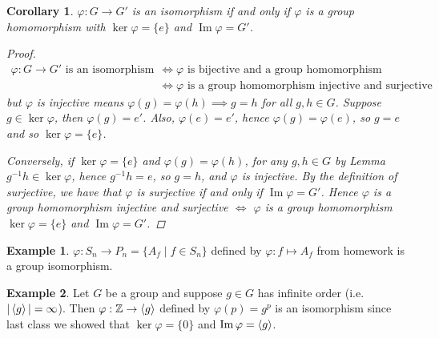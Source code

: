 \documentclass[12pt,letterpaper,DIV=11,final]{scrartcl}
\theoremstyle{plain}
\newtheorem{corollary}{Corollary}
\theoremstyle{definition}
\newtheorem{example}{Example}[section]
\theoremstyle{remark}
\DeclareMathOperator{\ima}{Im}
\begin{document}
\begin{corollary}\label{cor:isomorphism_iff_homomorphism}
  $\varphi : G \to G'$ is an isomorphism if and only if $\varphi$ is a group homomorphism with $\ker \varphi = \{ e \}$ and $\ima \varphi = G'$.

  \begin{proof}
    \begin{align*}
      \varphi: G \to G' \text{ is an isomorphism} &\iff \varphi \text{ is bijective and a group homomorphism} \\
                                                  &\iff \varphi \text{ is a group homomorphism injective and surjective}
    \end{align*}
    but $\varphi$ is injective means $\varphi(g) = \varphi(h) \implies g = h$ for all $g, h \in G$.
    Suppose $g \in \ker \varphi$, then $\varphi(g) = e'$.
    Also, $\varphi(e) = e'$, hence $\varphi(g) = \varphi(e)$, so $g = e$ and so $\ker \varphi = \{ e \}$.

    Conversely, if $\ker \varphi = \{ e \}$ and $\varphi(g) = \varphi(h)$, for any $g, h \in G$ by Lemma $g^{-1} h \in \ker \varphi$, hence $g^{-1} h = e$, so $g = h$, and $\varphi$ is injective.
    By the definition of surjective, we have that $\varphi$ is surjective if and only if $\ima \varphi = G'$.
    Hence $\varphi$ is a group homomorphism injective and surjective $\iff$ $\varphi$ is a group homomorphism $\ker \varphi = \{ e \}$ and $\ima \varphi = G'$.
  \end{proof}
\end{corollary}

\begin{example}
  $\varphi : S_n \to P_n = \{ A_f \mid f \in S_n \}$ defined by $\varphi : f \mapsto A_f$ from homework is a group isomorphism.
\end{example}

\begin{example}
  Let $G$ be a group and suppose $g \in G$ has infinite order (i.e. $|\braket{g}| = \infty$).
  Then $\varphi : \mathbb{Z} \to \braket{g}$ defined by $\varphi(p) = g^p$ is an isomorphism since last class we showed that $\ker \varphi = \{ 0 \}$ and $\ima \varphi = \braket{g}$.
\end{example}
\end{document}
